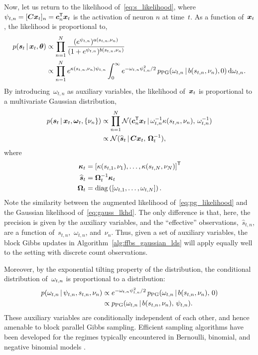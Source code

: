 Now, let us return to the likelihood of~\eqref{eq:s_likelihood},
where~${\psi_{t,n} = [\boldsymbol{C} \boldsymbol{x}_t]_n = \boldsymbol{c}_n^{\mathsf{T}} \boldsymbol{x}_t}$ is the activation of neuron $n$
at time~$t$. As a function of~$\boldsymbol{x}_t$, the likelihood is proportional to,
\begin{align*}
  p(\boldsymbol{s}_t \,|\, \boldsymbol{x}_t, \boldsymbol{\theta})
  &\propto \prod_{n=1}^N 
  \frac{(e^{\psi_{t,n}})^{a(s_{t,n}, \nu_n)}}
       {(1+e^{\psi_{t,n}})^{b(s_{t,n}, \nu_n)}} \\
  &\propto \prod_{n=1}^N 
     e^{\kappa(s_{t,n}, \nu_n) \psi_{t,n}}
  \int_{0}^{\infty} e^{-{\omega}_{t,n} \psi_{t,n}^2 /2} \,
  p_{\mathrm{PG}}({\omega}_{t,n} \,|\, b(s_{t,n}, \nu_n), 0) \,
  \mathrm{d}{\omega}_{t,n}.
\end{align*}
By introducing~$\omega_{t,n}$ as auxiliary variables,
the likelihood of~$\boldsymbol{x}_t$ is proportional to a multivariate Gaussian
distribution,
\begin{align}
  \nonumber
  p(\boldsymbol{s}_t \,|\, \boldsymbol{x}_t, \boldsymbol{\omega}_t, \{\nu_n\})
  &\propto \prod_{n=1}^N
  \mathcal{N}(\boldsymbol{c}_n^{\mathsf{T}} \boldsymbol{x}_t \,|\,
  \omega_{t,n}^{-1} \kappa(s_{t,n}, \nu_n), \,
  \omega_{t,n}^{-1}) \\
  \label{eq:pg_likelihood}
  &\propto \mathcal{N}(
  \widehat{\boldsymbol{s}}_t \,|\,
  \boldsymbol{C} \boldsymbol{x}_t, \, 
  \boldsymbol{\Omega}_t^{-1}),
\end{align}
where
\begin{align*}
  \boldsymbol{\kappa}_t &= \left[\kappa(s_{t,1}, \nu_1), \ldots, \kappa(s_{t,N}, \nu_N) \right]^{\mathsf{T}} \\
  \widehat{\boldsymbol{s}}_t &= \boldsymbol{\Omega}_t^{-1} \boldsymbol{\kappa}_t \\
  \boldsymbol{\Omega}_t &= \mathrm{diag} \left( \left[ \omega_{t,1}, \ldots, \omega_{t,N} \right] \right).
\end{align*}
Note the similarity between the augmented likelihood
of~\eqref{eq:pg_likelihood} and the Gaussian likelihood
of~\eqref{eq:gauss_lkhd}. The only difference is that, here, the
precision is given by the auxiliary variables, and the ``effective''
observations,~$\widehat{s}_{t,n}$, are a function 
of~$s_{t,n}$,~$\omega_{t,n}$, and~$\nu_n$.  Thus, given a set of
\polyagamma auxiliary variables, the block Gibbs updates in
Algorithm~\ref{alg:ffbs_gaussian_lds} will apply equally well to the
setting with discrete count observations.

Moreover, by the exponential tilting property of the \polyagamma
distribution, the conditional distribution of~${\omega}_{t,n}$
is proportional to a \polyagamma distribution:
\begin{align}
  \nonumber
  p({\omega}_{t,n} \,|\, \psi_{t,n}, s_{t,n}, \nu_n) &
  \propto e^{-{\omega}_{t,n} \psi_{t,n}^2/2} \,
  p_{\mathrm{PG}}({\omega}_{t,n} \,|\, b(s_{t,n}, \nu_n), \, 0) \\
  \label{eq:omega_conditional}
  &\propto p_{\mathrm{PG}}({\omega}_{t,n} \,|\, b(s_{t,n}, \nu_n), \, \psi_{t,n}).
\end{align}
These auxiliary variables are conditionally independent of each other,
and hence amenable to block parallel Gibbs sampling.  Efficient
\polyagamma sampling algorithms have been developed for the regimes
typically encountered in Bernoulli, binomial, and negative binomial
models \citep{windle2014sampling}.

